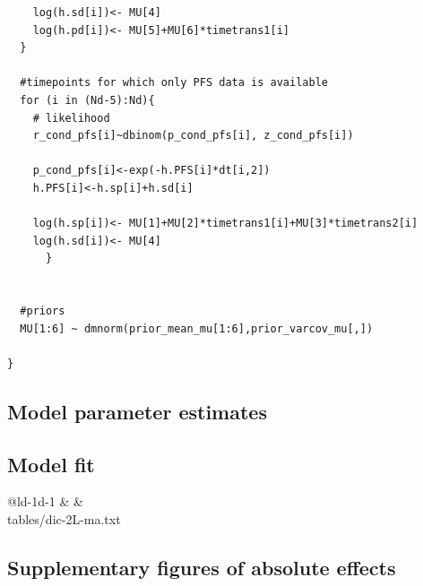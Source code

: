 \documentclass[11pt,final,fleqn]{article}\usepackage[]{graphicx}\usepackage[]{color}
\makeatletter
\theoremstyle{plain}
\newcommand*\ExpandableInput[1]{\@@input#1 }
\makeatother
\begin{document}
\begin{appendices}
\begin{verbatim}
    log(h.sd[i])<- MU[4]
    log(h.pd[i])<- MU[5]+MU[6]*timetrans1[i]
  }
    
  #timepoints for which only PFS data is available 
  for (i in (Nd-5):Nd){
    # likelihood
    r_cond_pfs[i]~dbinom(p_cond_pfs[i], z_cond_pfs[i]) 
    
    p_cond_pfs[i]<-exp(-h.PFS[i]*dt[i,2])
    h.PFS[i]<-h.sp[i]+h.sd[i]
    
    log(h.sp[i])<- MU[1]+MU[2]*timetrans1[i]+MU[3]*timetrans2[i] 
    log(h.sd[i])<- MU[4] 
      }
  
  
  #priors
  MU[1:6] ~ dmnorm(prior_mean_mu[1:6],prior_varcov_mu[,]) 

}

\end{verbatim}

\subsection{Model parameter estimates}




\subsection{Model fit}\label{app:DIC-2l}

\begin{table}[!ht]
\begin{center}
\begin{threeparttable}
\caption{Deviance information criterion for second line fixed effects meta-analysis} \label{tbl:dic-ma-2L}
\begin{tabularx}{\textwidth}{@{\extracolsep{\fill}}ld{-1}d{-1}}
\hline
{} &  &   \\
\hline
\ExpandableInput{tables/dic-2L-ma.txt}
\hline
\end{tabularx}
\scriptsize
\end{threeparttable}
\end{center}
\end{table}

\subsection{Supplementary figures of absolute effects}\label{app:2l-supp-figs}


\end{appendices}
\end{document}
